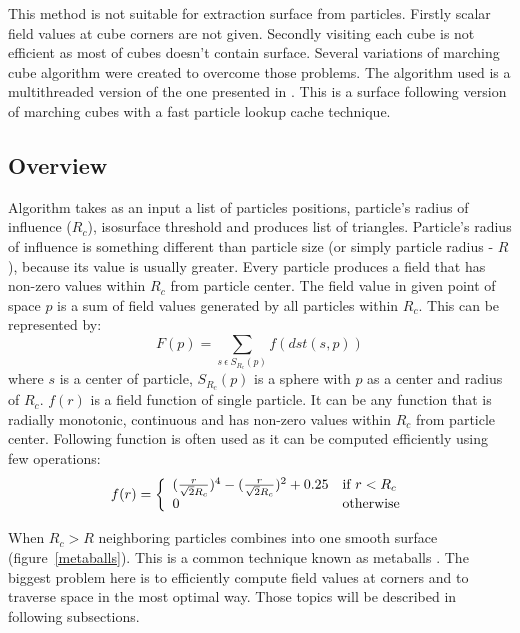 This method is not suitable for extraction surface from particles. Firstly scalar field values at cube corners are not given. Secondly visiting each cube is not efficient as most of cubes doesn't contain surface. Several variations of marching cube algorithm were created to overcome those problems. The algorithm used is a multithreaded version of the one presented in \cite{RosenbergBirdwell2008}. This is a surface following version of marching cubes with a fast particle lookup cache technique. 

\subsection{Overview} \label{sec:iso_overview}
Algorithm takes as an input a list of particles positions, particle's radius of influence ($R_c$), isosurface threshold and produces list of triangles. Particle's radius of influence is something different than particle size (or simply particle radius - $R$), because its value is usually greater. Every particle produces a field that has non-zero values within $R_c$ from particle center. The field value in given point of space $p$ is a sum of field values generated by all particles within $R_c$. This can be represented by:
\begin{equation}
\label{eq:field_equation}
F(p) = \sum_{s~\epsilon~S_{R_c}(p)} f(dst(s, p))
\end{equation}
where $s$ is a center of particle, $S_{R_c}(p)$ is a sphere with $p$ as a center and radius of $R_c$. $f(r)$ is a field function of single particle. It can be any function that is radially monotonic, continuous and has non-zero values within $R_c$ from particle center. Following function is often used as it can be computed efficiently using few operations:
\begin{equation}
\label{eq:single_field_equation}
f(r) = \left\{ \begin{array}{ll}
({r \over \sqrt{2}R_c} )^4 - ( {r \over \sqrt{2}R_c} )^2 + 0.25 & \textrm{if $r < R_c$}\\
0 & \textrm{otherwise}\\
\end{array} \right.
\end{equation}

When $R_c > R$ neighboring particles combines into one smooth surface  (figure~\ref{metaballs}). This is a common technique known as metaballs \cite{Blinn1982}. The biggest problem here is to efficiently compute field values at corners and to traverse space in the most optimal way. Those topics will be described in following subsections.
 
